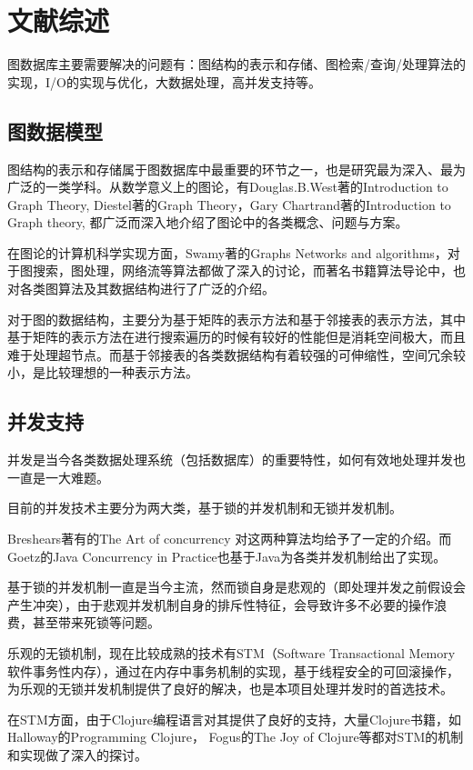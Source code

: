 \documentclass[a4paper]{ecust_thesis_openning}
\begin{document}
\section{文献综述}
	图数据库主要需要解决的问题有：图结构的表示和存储、图检索/查询/处理算法的实现，I/O的实现与优化，大数据处理，高并发支持等。

	\subsection{图数据模型}
		图结构的表示和存储属于图数据库中最重要的环节之一，也是研究最为深入、最为广泛的一类学科。从数学意义上的图论，有Douglas.B.West著的Introduction to Graph Theory, Diestel著的Graph Theory，Gary Chartrand著的Introduction to Graph theory, 都广泛而深入地介绍了图论中的各类概念、问题与方案。

		在图论的计算机科学实现方面，Swamy著的Graphs Networks and algorithms，对于图搜索，图处理，网络流等算法都做了深入的讨论，而著名书籍算法导论中，也对各类图算法及其数据结构进行了广泛的介绍。

		对于图的数据结构，主要分为基于矩阵的表示方法和基于邻接表的表示方法，其中基于矩阵的表示方法在进行搜索遍历的时候有较好的性能但是消耗空间极大，而且难于处理超节点。而基于邻接表的各类数据结构有着较强的可伸缩性，空间冗余较小，是比较理想的一种表示方法。

	\subsection{并发支持}
		并发是当今各类数据处理系统（包括数据库）的重要特性，如何有效地处理并发也一直是一大难题。

		目前的并发技术主要分为两大类，基于锁的并发机制和无锁并发机制。

		Breshears著有的The Art of concurrency 对这两种算法均给予了一定的介绍。而Goetz的Java Concurrency in Practice也基于Java为各类并发机制给出了实现。
	
		基于锁的并发机制一直是当今主流，然而锁自身是悲观的（即处理并发之前假设会产生冲突），由于悲观并发机制自身的排斥性特征，会导致许多不必要的操作浪费，甚至带来死锁等问题。

		乐观的无锁机制，现在比较成熟的技术有STM（Software Transactional Memory软件事务性内存），通过在内存中事务机制的实现，基于线程安全的可回滚操作，为乐观的无锁并发机制提供了良好的解决，也是本项目处理并发时的首选技术。

		在STM方面，由于Clojure编程语言对其提供了良好的支持，大量Clojure书籍，如Halloway的Programming Clojure， Fogus的The Joy of Clojure等都对STM的机制和实现做了深入的探讨。
\end{document}
